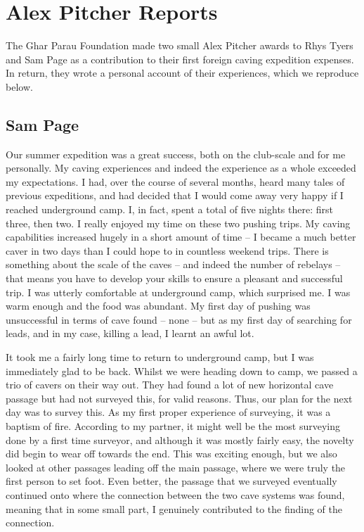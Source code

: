 \section{Alex Pitcher Reports}
The Ghar Parau Foundation made two small Alex Pitcher awards to Rhys Tyers and Sam Page as a contribution to their first foreign caving expedition expenses. In return, they wrote a personal account of their experiences, which we reproduce below.

\subsection {Sam Page}

Our summer expedition was a great success, both on the club-scale and for me personally. My caving experiences and indeed the experience as a whole exceeded my expectations. I had, over the course of several months, heard many tales of previous expeditions, and had decided that I would come away very happy if I reached underground camp. I, in fact, spent a total of five nights there: first three, then two. I really enjoyed my time on these two pushing trips. My caving capabilities increased hugely in a short amount of time – I became a much better caver in two days than I could hope to in countless weekend trips. There is something about the scale of the caves – and indeed the number of rebelays – that means you have to develop your skills to ensure a pleasant and successful trip. I was utterly comfortable at underground camp, which surprised me. I was warm enough and the food was abundant. My first day of pushing was unsuccessful in terms of cave found – none – but as my first day of searching for leads, and in my case, killing a lead, I learnt an awful lot.

It took me a fairly long time to return to underground camp, but I was immediately glad to be back. Whilst we were heading down to camp, we passed a trio of cavers on their way out. They had found a lot of new horizontal cave passage but had not surveyed this, for valid reasons. Thus, our plan for the next day was to survey this. As my first proper experience of surveying, it was a baptism of fire. According to my partner, it might well be the most surveying done by a first time surveyor, and although it was mostly fairly easy, the novelty did begin to wear off towards the end. This was exciting enough, but we also looked at other passages leading off the main passage, where we were truly the first person to set foot. Even better, the passage that we surveyed eventually continued onto where the connection between the two cave systems was found, meaning that in some small part, I genuinely contributed to the finding of the connection.

